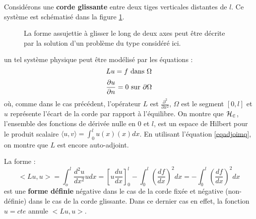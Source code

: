\documentclass[12pt]{book}
\begin{document}
\begin{exmp}
Consid\'erons une {\bf corde glissante} entre deux tiges verticales distantes
de $l$. 
Ce syst\`eme est sch\'ematis\'e dans la figure \ref{figcordeg}.
\begin{figure}[htb]
 \centerline{}   
 \caption{La forme assujettie \`a glisser le long de deux axes peut \^etre
d\'ecrite par la solution 
d'un probl\`eme du type consid\'er\'e ici.}
 \label{figcordeg}
\end{figure}
un tel syst\`eme physique peut \^etre mod\'elis\'e par les \'equations :
\begin{equation}
Lu=f\ {\rm dans}\ \Omega
\end{equation}
\begin{equation}
\frac{\partial u}{\partial n}=0\ {\rm sur}\ \partial\Omega
\end{equation}
o\`u, comme dans le cas pr\'ec\'edent, l'op\'erateur $L$ est 
$\frac{\partial^{2}}{\partial x^{2}}$, $\Omega$ est le segment $[0,l]$
et $u$ repr\'esente l'\'ecart de la corde par rapport \`a l'\'equilibre.
On montre que $\cal H_2$,
l'ensemble des fonctions de d\'eriv\'ee nulle en $0$ et $l$, est un
espace de Hilbert 
pour le produit scalaire $\langle u,v \rangle=\int_0^lu(x)(x) dx$.
En utilisant l'\'equation \ref{eqadjoimq}, on montre que $L$ est
encore auto-adjoint.
\end{exmp}


La forme :
\begin{equation}
<Lu,u>=\int_o^l\frac{d^2u}{dx^2}udx=
[u\frac{du}{dx}]_0^l-\int_0^l(\frac{df}{dx})^2dx=
-\int_0^l(\frac{df}{dx})^2dx 
\end{equation}
est une {\bf forme d\'efinie} n\'egative dans le cas de la corde fix\'ee et n\'egative
(non-d\'efinie) dans le cas de la corde glissante. Dans ce dernier cas
en effet, la fonction $u=cte$ annule  $<Lu,u>$.
\end{document}
